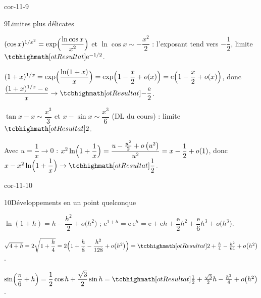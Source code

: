 \begin{blocLivre}{cor-11-9}
\begin{corrige}{9}{Limites plus délicates}
\begin{questions}
  \item $(\cos x)^{1/x^{2}}=\exp\Bigl(\dfrac{\ln\cos x}{x^{2}}\Bigr)$ et
    $\ln\cos x\sim-\dfrac{x^{2}}{2}$ : l'exposant tend vers $-\dfrac12$,
    limite $\res{\mathrm{e}^{-1/2}}$.
  \item $(1+x)^{1/x}=\exp\Bigl(\dfrac{\ln(1+x)}{x}\Bigr)
    =\exp\Bigl(1-\dfrac{x}{2}+o(x)\Bigr)
    =\mathrm{e}\Bigl(1-\dfrac{x}{2}+o(x)\Bigr)$,
    donc $\dfrac{(1+x)^{1/x}-\mathrm{e}}{x}\to\res{-\dfrac{\mathrm{e}}{2}}$.
  \item $\tan x-x\sim\dfrac{x^{3}}{3}$ et $x-\sin x\sim\dfrac{x^{3}}{6}$
    (DL du cours) : limite $\res{2}$.
  \item Avec $u=\dfrac1x\to0$ :
    $x^{2}\ln\Bigl(1+\dfrac1x\Bigr)=\dfrac{u-\frac{u^{2}}{2}+o\left(u^{2}\right)}{u^{2}}
    =x-\dfrac12+o(1)$, donc
    $x-x^{2}\ln\Bigl(1+\dfrac1x\Bigr)\to\res{\dfrac12}$.
\end{questions}
\end{corrige}
\end{blocLivre}

\begin{blocLivre}{cor-11-10}
\begin{corrige}{10}{Développements en un point quelconque}
\begin{questions}
  \item $\ln(1+h)=h-\dfrac{h^{2}}{2}+o\bigl(h^{2}\bigr)$ ;
    $\mathrm{e}^{1+h}=\mathrm{e}\,\mathrm{e}^{h}
    =\mathrm{e}+\mathrm{e}h+\dfrac{\mathrm{e}}{2}h^{2}+\dfrac{\mathrm{e}}{6}h^{3}+o\bigl(h^{3}\bigr)$.
  \item $\sqrt{4+h}=2\sqrt{1+\dfrac{h}{4}}
    =2\Bigl(1+\dfrac{h}{8}-\dfrac{h^{2}}{128}+o\bigl(h^{2}\bigr)\Bigr)
    =\res{2+\frac{h}{4}-\frac{h^{2}}{64}+o\bigl(h^{2}\bigr)}$.
  \item $\sin\Bigl(\dfrac{\pi}{6}+h\Bigr)
    =\dfrac12\cos h+\dfrac{\sqrt3}{2}\sin h
    =\res{\frac12+\frac{\sqrt3}{2}h-\frac{h^{2}}{4}+o\bigl(h^{2}\bigr)}$.
\end{questions}
\end{corrige}
\end{blocLivre}

